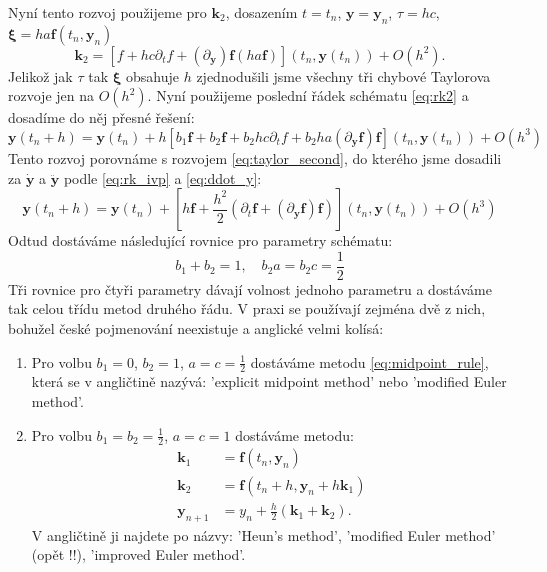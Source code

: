 \documentclass[a4paper, 12pt]{book}
\theoremstyle{definition}
\def\vc#1{\mathbf{\boldsymbol{#1}}}     %
\def\prtl{\partial}                                        %
\begin{document}
Nyní tento rozvoj použijeme pro $\vc k_2$, dosazením $t= t_n$, $\vc y = \vc y_n$, $\tau = hc$, $\vc \xi = ha \vc f(t_n, \vc y_n)$
\[
    \vc k_2 = [f + hc\prtl_t f + (\prtl_{\vc y}) \vc f (ha\vc f)](t_n, \vc y(t_n)) + O(h^2).
\]
Jelikož jak $\tau$ tak $\vc \xi$ obsahuje $h$ zjednodušili jsme všechny tři chybové Taylorova rozvoje jen na $O(h^2)$.
Nyní použijeme poslední řádek schématu \eqref{eq:rk2} a dosadíme do něj přesné řešení:
\[
  \vc y(t_n + h) = \vc y(t_n) + h\left[ b_1 \vc f + b_2 \vc f + b_2 hc\prtl_t f + b_2ha(\prtl_{\vc y} \vc f) \vc f \right](t_n, \vc y(t_n)) + O(h^3)
\]
Tento rozvoj porovnáme s rozvojem \eqref{eq:taylor_second}, do kterého jsme dosadili za $\dot{\vc y}$ a $\ddot{ \vc y}$ podle 
\eqref{eq:rk_ivp} a \eqref{eq:ddot_y}:
\begin{equation}
  \label{eq:Tylor_solution}
  \vc y(t_n + h) = \vc y(t_n) + \left[h\vc f + \frac{h^2}{2}(\prtl_t \vc f + (\prtl_{\vc y} \vc f) \vc f)\right](t_n, \vc y(t_n)) + O(h^3)  
\end{equation}
Odtud dostáváme následující rovnice pro parametry schématu:
\[
   b_1 + b_2 = 1,\quad b_2 a = b_2 c = \frac12
\]
Tři rovnice pro čtyři parametry dávají volnost jednoho parametru a dostáváme tak celou třídu metod druhého řádu. V praxi se používají zejména dvě
z nich, bohužel české pojmenování neexistuje a anglické velmi kolísá:
\begin{enumerate}
 \item Pro volbu $b_1 =0$, $b_2 =1$, $a=c=\frac12$ dostáváme  metodu  \eqref{eq:midpoint_rule}, 
 která se v angličtině nazývá: 'explicit midpoint method' nebo 'modified Euler method'.
 \item Pro volbu $b_1 = b_2 = \frac12$, $a=c=1$ dostáváme metodu:
 \begin{align}
    \label{eq:trapezoid_rule}
    \vc k_1 &= \vc f(t_n, \vc y_n)\\
    \vc k_2 &= \vc f(t_n + h, \vc y_n + h \vc k_1)\\
    {\vc y}_{n+1} &= y_n + \frac{h}{2}(\vc k_1 + \vc k_2).
 \end{align}
 V angličtině ji najdete po názvy: 'Heun's method', 'modified Euler method' (opět !!), 'improved Euler method'. 
\end{enumerate}
\end{document}
